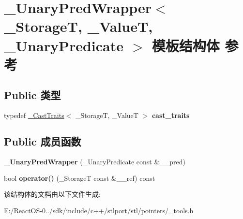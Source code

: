 \hypertarget{struct___unary_pred_wrapper}{}\section{\+\_\+\+Unary\+Pred\+Wrapper$<$ \+\_\+\+StorageT, \+\_\+\+ValueT, \+\_\+\+Unary\+Predicate $>$ 模板结构体 参考}
\label{struct___unary_pred_wrapper}
\subsection*{Public 类型}
\begin{DoxyCompactItemize}
\item 
\mbox{\label{struct___unary_pred_wrapper_a8b1bb76da440f5562f3c5c08705d27d3}} 
typedef \hyperlink{struct___cast_traits}{\+\_\+\+Cast\+Traits}$<$ \+\_\+\+StorageT, \+\_\+\+ValueT $>$ {\bfseries cast\+\_\+traits}
\end{DoxyCompactItemize}
\subsection*{Public 成员函数}
\begin{DoxyCompactItemize}
\item 
\mbox{\label{struct___unary_pred_wrapper_a4849470606791af4c4696cbceaacf9a5}} 
{\bfseries \+\_\+\+Unary\+Pred\+Wrapper} (\+\_\+\+Unary\+Predicate const \&\+\_\+\+\_\+pred)
\item 
\mbox{\label{struct___unary_pred_wrapper_a8e2d9b0bc7d57d78f3dc3e75f379a797}} 
bool {\bfseries operator()} (\+\_\+\+StorageT const \&\+\_\+\+\_\+ref) const
\end{DoxyCompactItemize}


该结构体的文档由以下文件生成\+:\begin{DoxyCompactItemize}
\item 
E\+:/\+React\+O\+S-\/0../sdk/include/c++/stlport/stl/pointers/\+\_\+tools.\+h\end{DoxyCompactItemize}
